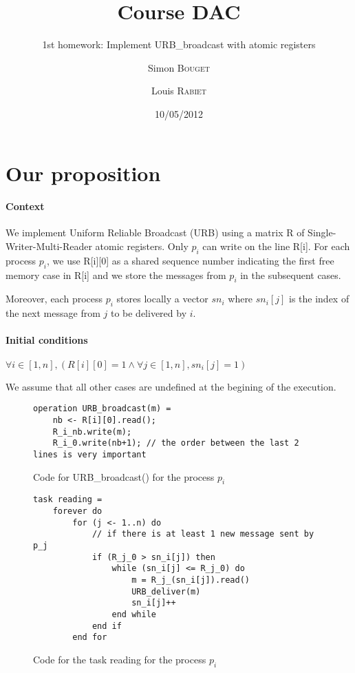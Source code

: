 \documentclass{scrartcl}
\title{Course DAC}
\subtitle{1st homework: Implement URB\_broadcast with atomic registers}
\author{Simon \textsc{Bouget} \and Louis \textsc{Rabiet}}
\date{10/05/2012}
\begin{document}
\maketitle


\section{Our proposition}

\paragraph{Context} We implement Uniform Reliable Broadcast (URB) using a matrix R of Single-Writer-Multi-Reader atomic registers. Only $p_i$ can write on the line R[i]. For each process $p_i$, we use R[i][0] as a shared sequence number indicating the first free memory case in R[i] and we store the messages from $p_i$ in the subsequent cases.

Moreover, each process $p_i$ stores locally a vector $sn_i$ where $sn_i[j]$ is the index of the next message from $j$ to be delivered by $i$.

\paragraph{Initial conditions} $\forall i \in [1,n], ( R[i][0] = 1   \wedge  \forall j \in [1,n], sn_i[j] = 1)$

We assume that all other cases are undefined at the begining of the execution.
\begin{figure}[h!]
\centering
\begin{lstlisting}
operation URB_broadcast(m) =
	nb <- R[i][0].read();
	R_i_nb.write(m);
	R_i_0.write(nb+1); // the order between the last 2 lines is very important
\end{lstlisting}	
\caption{Code for URB\_broadcast() for the process $p_i$}
\end{figure}
\begin{figure}[h!]
\centering
\begin{lstlisting}
task reading =
	forever do
		for (j <- 1..n) do
			// if there is at least 1 new message sent by p_j
			if (R_j_0 > sn_i[j]) then 
				while (sn_i[j] <= R_j_0) do
					m = R_j_(sn_i[j]).read()
					URB_deliver(m)
					sn_i[j]++
				end while
			end if
		end for
\end{lstlisting}
\caption{Code for the task reading for the process $p_i$}
\end{figure}
\end{document}
